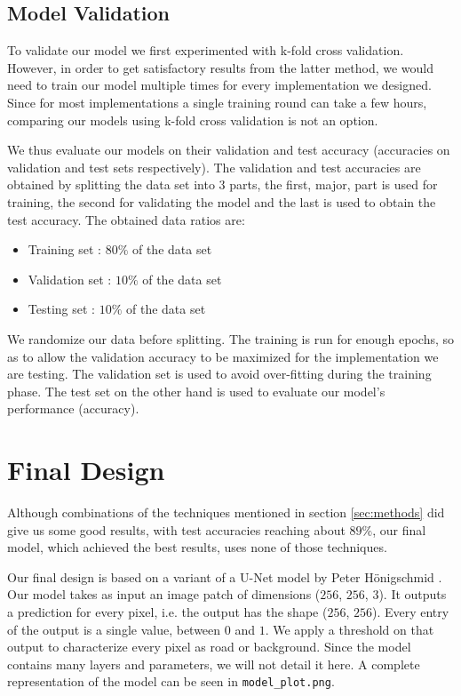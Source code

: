\documentclass[10pt,conference,compsocconf]{IEEEtran}
\begin{document}
\subsection{Model Validation} 
\label{ssec:model_validation}

To validate our model we first experimented with k-fold cross validation. However, in order to get satisfactory results from the latter method, we would need to train our model multiple times for every implementation we designed. Since for most implementations a single training round can take a few hours, comparing our models using k-fold cross validation is not an option.

We thus evaluate our models on their validation and test accuracy (accuracies on validation and test sets respectively). The validation and test accuracies are obtained by splitting the data set into 3 parts, the first, major, part is used for training, the second for validating the model and the last is used to obtain the test accuracy. The obtained data ratios are: 
\begin{itemize}
	\item Training set : $80\%$ of the data set
	\item Validation set : $10\%$ of the data set
	\item Testing set : $10\%$ of the data set
\end{itemize}
We randomize our data before splitting. The training is run for enough epochs, so as to allow the validation accuracy to be maximized for the implementation we are testing. The validation set is used to avoid over-fitting during the training phase. The test set on the other hand is used to evaluate our model's performance (accuracy).

\section{Final Design}
\label{sec:final}
Although combinations of the techniques mentioned in section \ref{sec:methods} did give us some good results, with test accuracies reaching about $89\%$, our final model, which achieved the best results, uses none of those techniques.

Our final design is based on a variant of a U-Net model by Peter Hönigschmid \cite{unet}. Our model takes as input an image patch of dimensions ($256$, $256$, $3$). It outputs a prediction for every pixel, i.e. the output has the shape ($256$, $256$). Every entry of the output is a single value, between $0$ and $1$. We apply a threshold on that output to characterize every pixel as road or background. Since the model contains many layers and parameters, we will not detail it here. A complete representation of the model can be seen in \texttt{model\_plot.png}. 
\end{document}

